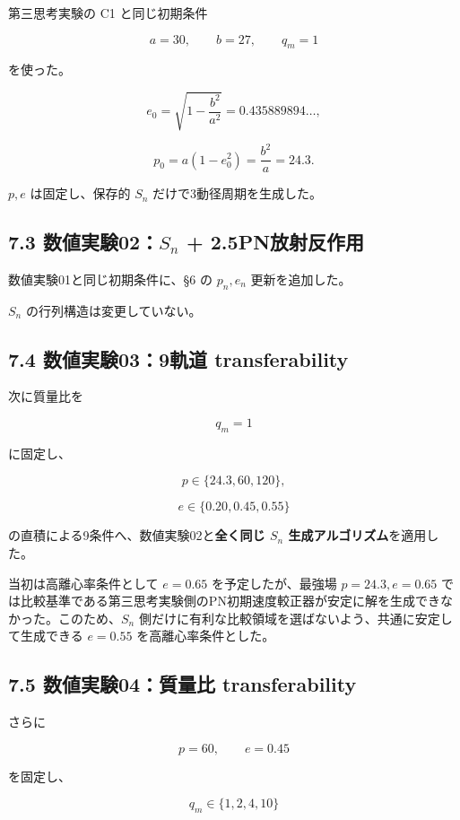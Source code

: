 \documentclass[
  a4paper,
]{ltjsarticle}
\begin{document}
第三思考実験の C1 と同じ初期条件

\[
a=30,
\qquad b=27,
\qquad q_m=1
\]

を使った。

\[
e_0
=\sqrt{1-\frac{b^2}{a^2}}
=0.435889894\ldots,
\]

\[
p_0=a(1-e_0^2)=\frac{b^2}{a}=24.3.
\]

\(p,e\) は固定し、保存的 \(S_n\) だけで3動径周期を生成した。

\subsection{\texorpdfstring{7.3 数値実験02：\(S_n\) +
2.5PN放射反作用}{7.3 数値実験02：S\_n + 2.5PN放射反作用}}\label{ux6570ux5024ux5b9fux9a1302s_n-2.5pnux653eux5c04ux53cdux4f5cux7528}

数値実験01と同じ初期条件に、§6 の \(p_n,e_n\) 更新を追加した。

\(S_n\) の行列構造は変更していない。

\subsection{7.4 数値実験03：9軌道
transferability}\label{ux6570ux5024ux5b9fux9a13039ux8eccux9053-transferability}

次に質量比を

\[
q_m=1
\]

に固定し、

\[
p\in\{24.3,60,120\},
\]

\[
e\in\{0.20,0.45,0.55\}
\]

の直積による9条件へ、数値実験02と\textbf{全く同じ \(S_n\)
生成アルゴリズム}を適用した。

当初は高離心率条件として \(e=0.65\) を予定したが、最強場
\(p=24.3,e=0.65\)
では比較基準である第三思考実験側のPN初期速度較正器が安定に解を生成できなかった。このため、\(S_n\)
側だけに有利な比較領域を選ばないよう、共通に安定して生成できる
\(e=0.55\) を高離心率条件とした。

\subsection{7.5 数値実験04：質量比
transferability}\label{ux6570ux5024ux5b9fux9a1304ux8ceaux91cfux6bd4-transferability}

さらに

\[
p=60,
\qquad e=0.45
\]

を固定し、

\[
q_m\in\{1,2,4,10\}
\]
\end{document}
